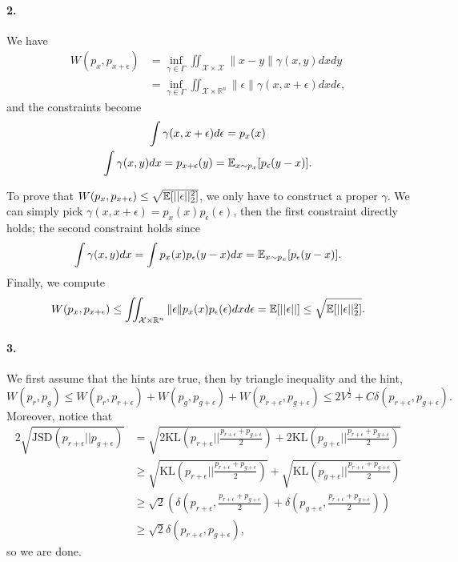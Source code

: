 \documentclass[a4 paper,12pt]{article}
\begin{document}
\paragraph*{2.} We have
\begin{align*}
W(p_x,p_{x+\epsilon})&=\inf_{\gamma\in \Gamma}\iint_{\mathcal{X}\times \mathcal{X}}\|x-y\|\gamma(x,y)dxdy\\
&=\inf_{\gamma\in \Gamma}\iint_{\mathcal{X}\times \mathbb{R}^n}\|\epsilon\|\gamma(x,x+\epsilon)dxd\epsilon,
\end{align*} and the constraints become
\begin{gather*}
\int \gamma(x,x+\epsilon)d\epsilon=p_{x}(x)\\
\int \gamma(x,y)dx=p_{x+\epsilon}(y)=\mathbb{E}_{x\sim p_x} [p_\epsilon(y-x)].
\end{gather*}

To prove that $W(p_x,p_{x+\epsilon})\le \sqrt{\mathbb{E} [||\epsilon||_2^2]}$, we only have to construct a proper $\gamma$. We can simply pick $\gamma(x,x+\epsilon)=p_x(x)p_\epsilon(\epsilon)$, then the first constraint directly holds; the second constraint holds since
\[
\int \gamma(x,y)dx=\int p_x(x)p_\epsilon(y-x)dx=\mathbb{E}_{x\sim p_x} [p_\epsilon(y-x)].
\] Finally, we compute
\begin{align*}
W(p_x,p_{x+\epsilon})\le \iint_{\mathcal{X}\times \mathbb{R}^n}\|\epsilon\|p_x(x)p_{\epsilon}(\epsilon)dxd\epsilon=\mathbb{E}[||\epsilon||]\le \sqrt{\mathbb{E}[||\epsilon||_2^2]}.
\end{align*}
\paragraph*{3.}
We first assume that the hints are true, then by triangle inequality and the hint,
\[
W(p_r,p_g)\le W(p_r,p_{r+\epsilon})+W(p_g,p_{g+\epsilon})+W(p_{r+\epsilon},p_{g+\epsilon})\le 2V^{\frac{1}{2}}+C\delta\left(p_{r+\epsilon},p_{g+\epsilon}\right).
\]
Moreover, notice that
\begin{align*}
2\sqrt{\text{JSD}(p_{r+\epsilon}||p_{g+\epsilon})}&=\sqrt{2\text{KL}\left(p_{r+\epsilon}||\frac{p_{r+\epsilon}+p_{g+\epsilon}}{2}\right)+2\text{KL}\left(p_{g+\epsilon}||\frac{p_{r+\epsilon}+p_{g+\epsilon}}{2}\right)}\\
&\ge \sqrt{\text{KL}\left(p_{r+\epsilon}||\frac{p_{r+\epsilon}+p_{g+\epsilon}}{2}\right)}+\sqrt{\text{KL}\left(p_{g+\epsilon}||\frac{p_{r+\epsilon}+p_{g+\epsilon}}{2}\right)}\\
&\ge \sqrt{2}\left(\delta\left(p_{r+\epsilon},\frac{p_{r+\epsilon}+p_{g+\epsilon}}{2}\right)+\delta \left(p_{g+\epsilon},\frac{p_{r+\epsilon}+p_{g+\epsilon}}{2}\right)\right)\\
&\ge \sqrt{2}\delta\left(p_{r+\epsilon},p_{g+\epsilon}\right),
\end{align*} so we are done.
\end{document}
